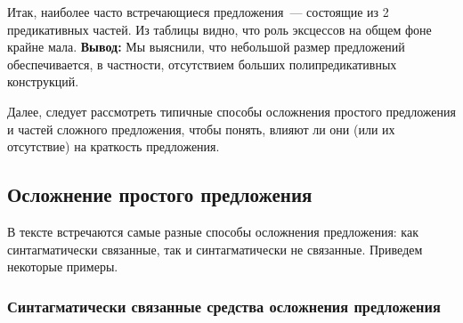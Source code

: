 \documentclass{kursa4}
\begin{document}
        Итак, наиболее часто встречающиеся предложения~--- состоящие из 2 предикативных частей. Из таблицы видно, что роль эксцессов на общем фоне крайне мала. \textbf{Вывод:}
        Мы выяснили, что небольшой размер предложений обеспечивается, в частности, отсутствием больших полипредикативных конструкций. 

        Далее, следует рассмотреть типичные способы осложнения простого предложения и частей сложного предложения, чтобы понять, влияют ли они (или их отсутствие) на краткость предложения. \subsection{Осложнение простого предложения}

        В тексте встречаются самые разные способы осложнения предложения: как синтагматически связанные, так и синтагматически не связанные. Приведем некоторые примеры. \subsubsection{Синтагматически связанные средства осложнения предложения}
\end{document}

